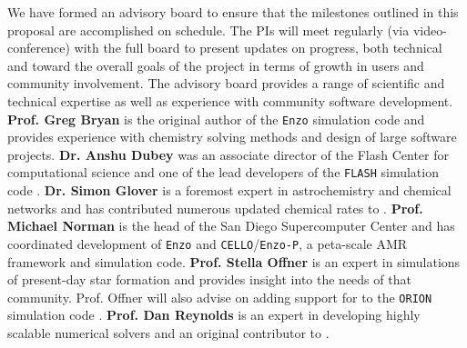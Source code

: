 We have formed an advisory board to ensure that the milestones
outlined in this proposal are accomplished on schedule. The PIs will
meet regularly (via video-conference) with the full board to present
updates on progress, both technical and toward the overall goals of
the project in terms of growth in users and community involvement.
The advisory board provides a range of scientific and technical
expertise as well as experience with community software development.
{\bf Prof. Greg Bryan} is the original author of the \texttt{Enzo}
simulation code and provides experience with chemistry solving methods
and design of large software projects.
{\bf Dr. Anshu Dubey} was an associate director of the Flash Center
for computational science and one of the lead developers of the
\texttt{FLASH} simulation code \citep{2000ApJS..131..273F,
  2009arXiv0903.4875D}.%
{\bf Dr. Simon Glover} is a foremost expert in astrochemistry and
chemical networks and has contributed numerous updated chemical rates to
\grackle{}.
{\bf Prof. Michael Norman} is the head of the San Diego Supercomputer
Center and has coordinated development of \texttt{Enzo} and
\texttt{CELLO}/\texttt{Enzo-P}, a peta-scale AMR framework and
simulation code.
{\bf Prof. Stella Offner} is an expert in simulations of present-day
star formation and provides insight into the needs of that community.
Prof. Offner will also advise on adding support for \grackle{} to the
\texttt{ORION} simulation code \citep{2012ApJ...745..139L}.
{\bf Prof. Dan Reynolds} is an expert in developing highly scalable
numerical solvers and an original contributor to \dengo{}.

